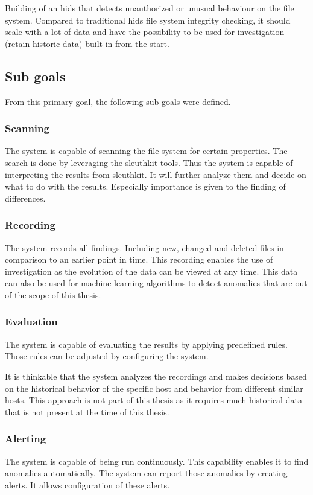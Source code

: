 \documentclass[
	a4paper,					%
	10pt,							%
	twoside,					%
	openright,				%
	notitlepage,			%
	parskip=half,			%
]{scrreprt}					%
\begin{document}
Building of an \gls{hids} that detects unauthorized or unusual behaviour on the file system. Compared to traditional \gls{hids} file system integrity checking, it should scale with a lot of data and have the possibility to be used for investigation (retain historic data) built in from the start.

\subsection{Sub goals}

From this primary goal, the following sub goals were defined. 

\subsubsection{Scanning}
The system is capable of scanning the file system for certain properties. The search is done by leveraging the sleuthkit tools. Thus the system is capable of interpreting the results from sleuthkit. It will further analyze them and decide on what to do with the results. Especially importance is given to the finding of differences.

\subsubsection{Recording}
The system records all findings. Including new, changed and deleted files in comparison to an earlier point in time. This recording enables the use of investigation as the evolution of the data can be viewed at any time. This data can also be used for machine learning algorithms to detect anomalies that are out of the scope of this thesis. 

\subsubsection{Evaluation}
The system is capable of evaluating the results by applying predefined rules. Those rules can be adjusted by configuring the system.

It is thinkable that the system analyzes the recordings and makes decisions based on the historical behavior of the specific host and behavior from different similar hosts. This approach is not part of this thesis as it requires much historical data that is not present at the time of this thesis. 

\subsubsection{Alerting}
The system is capable of being run continuously. This capability enables it to find anomalies automatically. The system can report those anomalies by creating alerts. It allows configuration of these alerts.
\end{document}
